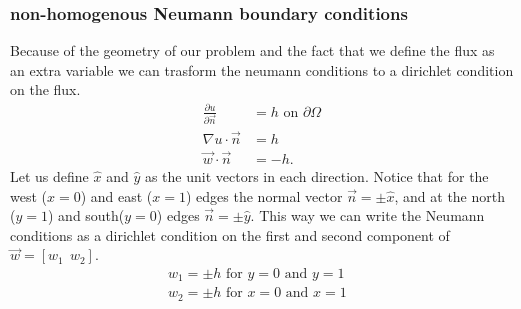 \subsubsection{non-homogenous Neumann boundary conditions}
Because of the geometry of our problem and the fact that we define the flux as an extra variable we can trasform the neumann conditions to a dirichlet condition on the flux. 
\begin{align}
	\frac{\partial u}{\partial \vec{n}} &= h \text{  on   } \partial \Omega \\
	\nabla u \cdot \vec{n} &= h \\
	 \vec{w} \cdot \vec{n} &= -h. 
	\label{eq:neumann}
\end{align}
Let us define $\hat{x}$ and $\hat{y}$ as the unit vectors in each direction. Notice that for the west ($x=0$) and east ($x=1$) edges the normal vector $\vec{n}= \pm\hat{x}$, and at the north ($y=1$) and south($y=0$) edges $\vec{n}=\pm \hat{y}$. This way we can write the Neumann conditions as a dirichlet condition on the first and second component of $\vec{w}= [ w_1 \:\: w_2]$. 
\begin{align}
	w_1 = \pm h \text{    for $y = 0$ and $y=1$ }\\
	w_2 = \pm h \text{    for $x = 0$ and $x=1$ }
	\label{eq:neumannAsDirichlet}
\end{align}
